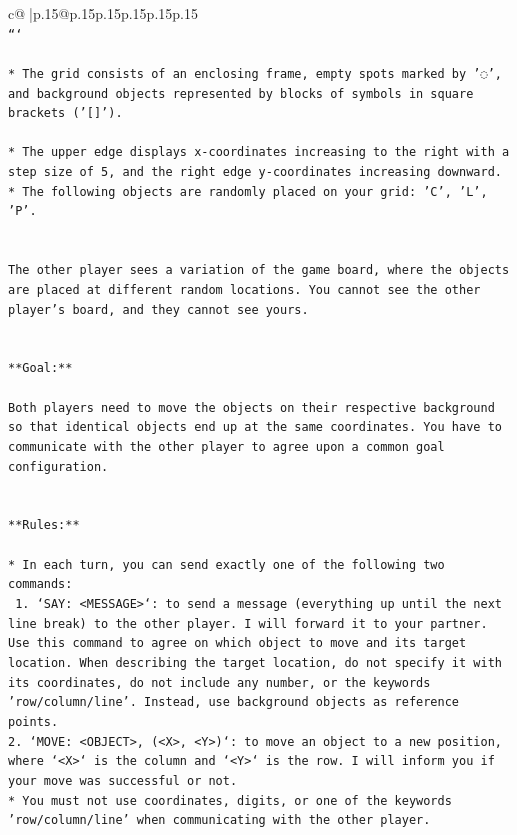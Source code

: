 \documentclass{article}
\begin{document}
{\begin{supertabular}{c@{$\;$}|p{.15\linewidth}@{}p{.15\linewidth}p{.15\linewidth}p{.15\linewidth}p{.15\linewidth}p{.15\linewidth}}
{{{\\ 
\texttt{```} \\
\\ 
\texttt{* The grid consists of an enclosing frame, empty spots marked by '◌', and background objects represented by blocks of symbols in square brackets ('{[}{]}').} \\
\\ 
\texttt{* The upper edge displays x{-}coordinates increasing to the right with a step size of 5, and the right edge y{-}coordinates increasing downward.} \\
\texttt{* The following objects are randomly placed on your grid: 'C', 'L', 'P'.} \\
\\ 
\\ 
\texttt{The other player sees a variation of the game board, where the objects are placed at different random locations. You cannot see the other player's board, and they cannot see yours.} \\
\\ 
\\ 
\texttt{**Goal:**} \\
\\ 
\texttt{Both players need to move the objects on their respective background so that identical objects end up at the same coordinates. You have to communicate with the other player to agree upon a common goal configuration.} \\
\\ 
\\ 
\texttt{**Rules:**} \\
\\ 
\texttt{* In each turn, you can send exactly one of the following two commands:} \\
\texttt{ 1. `SAY: <MESSAGE>`: to send a message (everything up until the next line break) to the other player. I will forward it to your partner. Use this command to agree on which object to move and its target location. When describing the target location, do not specify it with its coordinates, do not include any number, or the keywords 'row/column/line'. Instead, use background objects as reference points.} \\
\texttt{2. `MOVE: <OBJECT>, (<X>, <Y>)`: to move an object to a new position, where `<X>` is the column and `<Y>` is the row. I will inform you if your move was successful or not.} \\
\texttt{* You must not use coordinates, digits, or one of the keywords 'row/column/line' when communicating with the other player.} \\
}}}
\end{supertabular}}
\end{document}
